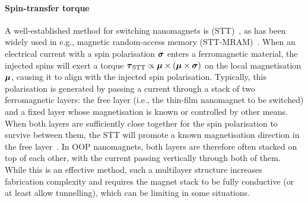 \paragraph{Spin-transfer torque}
A well-established method for switching nanomagnets is  (STT)~\cite{SlonczewskiSTT}, as has been widely used in e.g., magnetic random-access memory (STT-MRAM)~\cite{brataas2012current}.
When an electrical current with a spin polarisation $\boldsymbol{\mathbf{\sigma}}$ enters a ferromagnetic material, the injected spins will exert a torque $\boldsymbol{\mathbf{\tau}}_\mathrm{STT} \propto \boldsymbol{\mathbf{\mu}} \times (\boldsymbol{\mathbf{\mu}} \times \boldsymbol{\mathbf{\sigma}})$ on the local magnetisation $\boldsymbol{\mathbf{\mu}}$, causing it to align with the injected spin polarisation.
Typically, this polarisation is generated by passing a current through a stack of two ferromagnetic layers: the free layer (i.e., the thin-film nanomagnet to be switched) and a fixed layer whose magnetisation is known or controlled by other means.
When both layers are sufficiently close together for the spin polarisation to survive between them, the STT will promote a known magnetisation direction in the free layer~\cite{SOT_FM_AFM,mumax3tutorial}. %
In OOP nanomagnets, both layers are therefore often stacked on top of each other, with the current passing vertically through both of them.
While this is an effective method, such a multilayer structure increases fabrication complexity and requires the magnet stack to be fully conductive (or at least allow tunnelling), which can be limiting in some situations.


